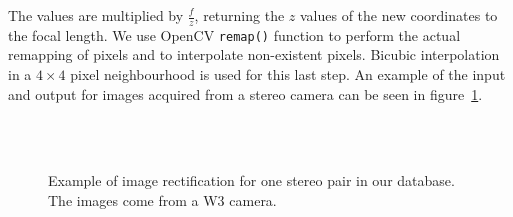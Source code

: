 The values are multiplied by $\frac{f}{z}$, returning the $z$ values of the new coordinates to the focal length. We use OpenCV \texttt{remap()} function to perform the actual remapping of pixels and to
interpolate non-existent pixels. Bicubic interpolation in a $4\times4$ pixel neighbourhood
is used for this last step. An example of the input and output for images acquired from a stereo camera can be seen in figure~\ref{fig:ex-rectification}.

\begin{figure}[h]
 \centering
 \\
 \\
 \caption[Example of image rectification]{Example of image rectification for one stereo pair in our database. The images come from a W3 camera.}
 \label{fig:ex-rectification}
\end{figure}


